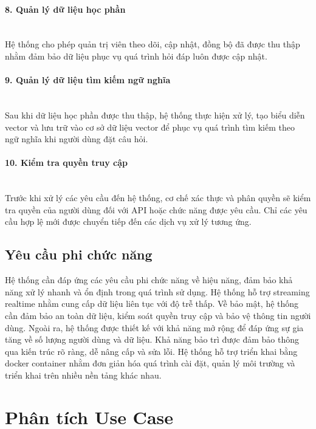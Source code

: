 \documentclass[../DoAn.tex]{subfiles}
\begin{document}
\paragraph{8. Quản lý dữ liệu học phần}\leavevmode\\
\hspace*{1em}Hệ thống cho phép quản trị viên theo dõi, cập nhật, đồng bộ đã được thu thập nhằm đảm bảo dữ liệu phục vụ quá trình hỏi đáp luôn được cập nhật.

\paragraph{9. Quản lý dữ liệu tìm kiếm ngữ nghĩa}\leavevmode\\
\hspace*{1em}Sau khi dữ liệu học phần được thu thập, hệ thống thực hiện xử lý, tạo biểu diễn vector và lưu trữ vào cơ sở dữ liệu vector để phục vụ quá trình tìm kiếm theo ngữ nghĩa khi người dùng đặt câu hỏi.

\paragraph{10. Kiểm tra quyền truy cập}\leavevmode\\
\hspace*{1em} Trước khi xử lý các yêu cầu đến hệ thống, cơ chế xác thực và phân quyền sẽ kiểm tra quyền của người dùng đối với API hoặc chức năng được yêu cầu. Chỉ các yêu cầu hợp lệ mới được chuyển tiếp đến các dịch vụ xử lý tương ứng.

\subsection{Yêu cầu phi chức năng}
Hệ thống cần đáp ứng các yêu cầu phi chức năng về hiệu năng, đảm bảo khả năng xử lý nhanh và ổn định trong quá trình sử dụng. Hệ thống hỗ trợ streaming realtime nhằm cung cấp dữ liệu liên tục với độ trễ thấp. Về bảo mật, hệ thống cần đảm bảo an toàn dữ liệu, kiểm soát quyền truy cập và bảo vệ thông tin người dùng. Ngoài ra, hệ thống được thiết kế với khả năng mở rộng để đáp ứng sự gia tăng về số lượng người dùng và dữ liệu. Khả năng bảo trì được đảm bảo thông qua kiến trúc rõ ràng, dễ nâng cấp và sửa lỗi. Hệ thống hỗ trợ triển khai bằng docker container nhằm đơn giản hóa quá trình cài đặt, quản lý môi trường và triển khai trên nhiều nền tảng khác nhau.

\section{Phân tích Use Case}
\end{document}
